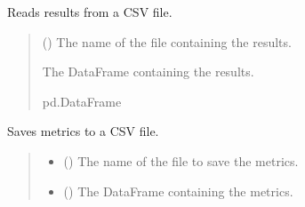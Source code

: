 \documentclass[letterpaper,10pt,english]{sphinxmanual}
\begin{document}
\begin{fulllineitems}

\begin{fulllineitems}
\label{\detokenize{modules:application.services.FileSystemService.FileSystemService.read_resultsFrom}}
\pysigstartsignatures
{}
\pysigstopsignatures
\sphinxAtStartPar
Reads results from a CSV file.
\begin{quote}\begin{description}
\sphinxAtStartPar
{} () \textendash{} The name of the file containing the results.

\sphinxAtStartPar
The DataFrame containing the results.

\sphinxAtStartPar
pd.DataFrame

\end{description}\end{quote}

\end{fulllineitems}


\begin{fulllineitems}
\label{\detokenize{modules:application.services.FileSystemService.FileSystemService.save_metricsTo}}
\pysigstartsignatures
{}
\pysigstopsignatures
\sphinxAtStartPar
Saves metrics to a CSV file.
\begin{quote}\begin{description}
\begin{itemize}
\item {} 
\sphinxAtStartPar
{} () \textendash{} The name of the file to save the metrics.

\item {} 
\sphinxAtStartPar
{} () \textendash{} The DataFrame containing the metrics.


\end{itemize}
\end{description}
\end{quote}
\end{fulllineitems}
\end{fulllineitems}
\end{document}
